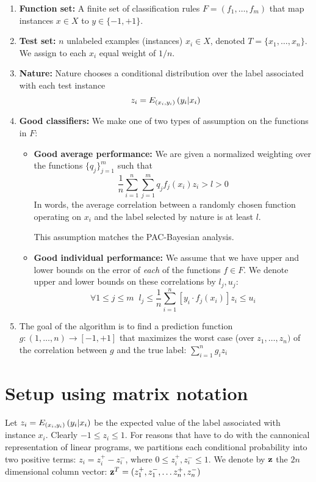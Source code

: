 \documentclass{article}[12pt]
\begin{document}
\begin{enumerate}
\item {\bf Function set:} A finite set of classification rules
  $F=(f_1,\ldots,f_m)$ that map instances $x \in X$ to $y \in \{-1,+1\}$.
\item {\bf Test set:} $n$ unlabeled examples (instances) $x_i \in X$,
  denoted $T=\{x_1,\ldots,x_n\}$. We assign to each $x_i$ equal
  weight of $1/n$.
\item {\bf Nature:} Nature chooses a conditional distribution over the
  label associated with each test instance
\[
z_i = E_{(x_i,y_i)}\left( y_i | x_i \right)
\]
\item {\bf Good classifiers:} We make one of two types of assumption
  on the functions in $F$:
\begin{itemize}
\item{\bf Good average performance:}
We are given a normalized weighting over the functions
$\{q_j\}_{j=1}^m$ such that
\[
\frac{1}{n} \sum_{i=1}^n \sum_{j=1}^m q_j f_j(x_i) z_i > l > 0
\] 
In words, the average correlation between a randomly chosen function
operating on $x_i$ and the label selected by nature is at least $l$.

This assumption matches the PAC-Bayesian analysis.

\item{\bf Good individual performance:} We assume that we have upper
  and lower bounds on the error of {\em each} of the functions $f \in
  F$. We denote upper and lower bounds on these correlations by $l_j,u_j$:
\[
\forall 1 \leq j \leq m\;\; 
l_j \leq 
\frac{1}{n} \sum_{i=1}^n 
\left[ y_i\cdot f_j(x_i)\right]  z_i
\leq u_i
\]
\end{itemize}
\item
The goal of the algorithm is to find a prediction function 
$g:(1,\ldots,n) \to [-1,+1]$ that maximizes the worst case (over
$z_1,\ldots,z_n)$ of the correlation between $g$ and the
true label: $\sum_{i=1}^n g_i z_i$
\end{enumerate}

\section{Setup using matrix notation}
Let $z_i = E_{(x_i,y_i)}\left( y_i | x_i \right)$ be the expected value of the label
associated with instance $x_i$. Clearly $-1 \leq z_i \leq 1$. For
reasons that have to do with the cannonical representation of linear
programs, we partitions each conditional probability into two positive
terms: $z_i=z_i^+ - z_i^-$, where $0 \leq z_i^+ , z_i^- \leq 1$. We
denote by $\mathbf{z}$ the $2n$ dimensional column vector:
$\mathbf{z}^T=(z_1^+,z_1^-,\ldots z_n^+,z_n^-)$
\end{document}
